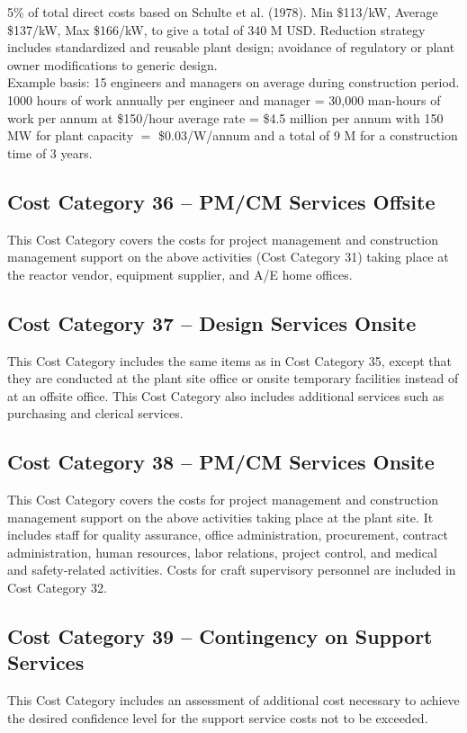 5\% of total direct costs based on Schulte et al. (1978). Min \$113/kW, Average \$137/kW, Max 
\$166/kW, to give a total of 340 M USD.  Reduction strategy includes standardized and reusable plant design; avoidance of regulatory or 
plant owner modifications to generic design.\\


Example basis: 15 engineers and managers on average during construction period. 
1000 hours of work annually per engineer and manager = 30,000 man-hours of work per 
annum at \$150/hour average rate = \$4.5 million per annum with 150 MW for plant capacity $=$ \$0.03/W/annum and a total of 9 M for a construction time of 3 years. 


\subsection*{Cost Category 36 – PM/CM Services Offsite}
This Cost Category covers the costs for project management and construction management support on the above activities (Cost Category 31) taking place at the reactor vendor, equipment supplier, and A/E home offices.

\subsection*{Cost Category 37 – Design Services Onsite}
This Cost Category includes the same items as in Cost Category 35, except that they are conducted at the plant site office or onsite temporary facilities instead of at an offsite office. This Cost Category also includes additional services such as purchasing and clerical services.

\subsection*{Cost Category 38 – PM/CM Services Onsite}
This Cost Category covers the costs for project management and construction management support on the above activities taking place at the plant site. It includes staff for quality assurance, office administration, procurement, contract administration, human resources, labor relations, project control, and medical and safety-related activities. Costs for craft supervisory personnel are included in Cost Category 32.

\subsection*{Cost Category 39 – Contingency on Support Services}
This Cost Category includes an assessment of additional cost necessary to achieve the desired confidence level for the support service costs not to be exceeded.

